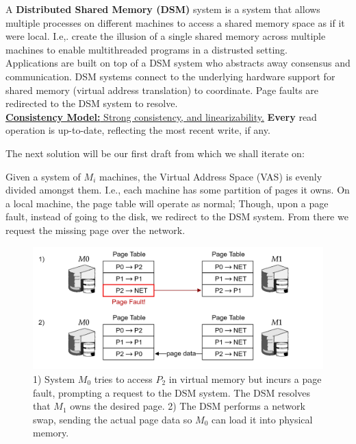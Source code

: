 \begin{Def}
    
    A \textbf{Distributed Shared Memory (DSM)} system is a system that allows multiple processes on different machines to access a shared memory space as if it were local.
    I.e,. create the illusion of a single shared memory across multiple machines to enable multithreaded programs in a distrusted setting.\\

    \noindent
    Applications are built on top of a DSM system who abstracts away consensus and communication. DSM systems 
    connect to the underlying hardware support for shared memory (virtual address translation) to coordinate.
    Page faults are redirected to the DSM system to resolve.\\

    \noindent
    \underline{\textbf{Consistency Model:} Strong consistency, and linearizability.} \textbf{Every} read operation is up-to-date, reflecting the most recent write, if any.

\end{Def}

\noindent
The next solution will be our first draft from which we shall iterate on:
\begin{Def}

    Given a system of $M_i$ machines, the Virtual Address Space (VAS) is evenly divided amongst them. I.e.,
    each machine has some partition of pages it owns. On a local machine, the page table will operate as normal;
    Though, upon a page fault, instead of going to the disk, we redirect to the DSM system. From there we request the missing page
    over the network.
\end{Def}

\begin{figure}[h]
    \centering
    \includegraphics[width=\textwidth]{Sections/shared/share.png}
    \caption{1) System $M_0$ tries to access $P_2$ in virtual memory but incurs a page fault, prompting a request to the DSM system. The DSM resolves that $M_1$ owns the desired page. 
    2) The DSM performs a network swap, sending the actual page data so $M_0$ can load it into physical memory.
    }
    \label{fig:dsm}
\end{figure}

